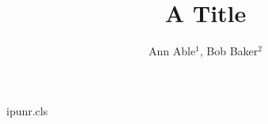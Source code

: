 \begin{filecontents*}[overwrite]{ipunr.cls}
\renewcommand{\author}[1]{{\raggedright #1\par}}
\newcommand{\affil}[1]{{\small\raggedright #1}}
\end{filecontents*}
\documentclass{ipunr}

\title{A Title}
\author{Ann Able$^{1}$, Bob Baker$^{2}$}




\maketitle
Text.

